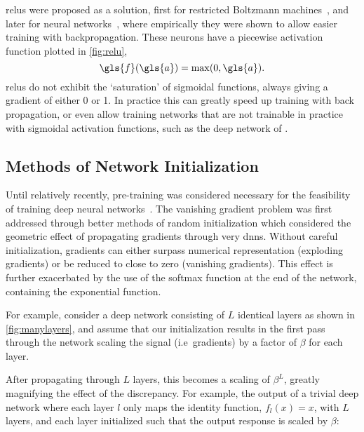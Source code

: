 \documentclass[thesis]{subfiles}
\begin{document}
\Glspl{relu} were proposed as a solution, first for restricted Boltzmann machines~\citep{conf/icml/NairH10}, and later for neural networks~\citep{glorot2010understanding}, where empirically they were shown to allow easier training with backpropagation. These neurons have a piecewise activation function plotted in \cref{fig:relu}, 
\begin{equation}
\gls{f}(\gls{a}) = \max(0,\gls{a}).
\end{equation} 
\glspl{relu} do not exhibit the `saturation' of sigmoidal functions, always giving a gradient of either 0 or 1. In practice this can greatly speed up training with back propagation, or even allow training networks that are not trainable in practice with sigmoidal activation functions, such as the deep network of \citet{Krizhevsky2012}.

\subsection{Methods of Network Initialization}\label{ssec:init}
Until relatively recently, pre-training was considered necessary for the feasibility of training deep neural networks~\citep{hinton2006reducing}. The vanishing gradient problem was first addressed through better methods of random initialization which considered the geometric effect of propagating gradients through very \glspl{dnn}. Without careful initialization, gradients can either surpass numerical representation (exploding gradients) or be reduced to close to zero (vanishing gradients). This effect is further exacerbated by the use of the softmax function at the end of the network, containing the exponential function.

For example, consider a deep network consisting of $L$ identical layers as shown in \cref{fig:manylayers}, and assume that our initialization results in the first pass through the network scaling the signal (i.e~gradients) by a factor of $\beta$ for each layer.

After propagating through $L$ layers, this becomes a scaling of $\beta^L$, greatly magnifying the effect of the discrepancy. For example, the output of a trivial deep network  where each layer $l$ only maps the identity function, $f_{l}(x) = x$, with $L$ layers, and each layer initialized such that the output response is scaled by $\beta$:
\end{document}
